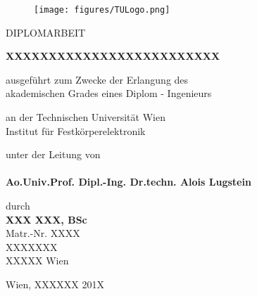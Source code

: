 
\begin{titlepage}

\begin{center}

\begin{figure}[ht]
	\centering
		\texttt{[image: figures/TULogo.png]}
	\label{fig:TULogo}
\end{figure}



\vfill

\LARGE{DIPLOMARBEIT}\\

\vfill

\LARGE{\textbf{XXXXXXXXXXXXXXXXXXXXXXXXX}}\\
\vfill

\large
ausgef\"uhrt zum Zwecke der Erlangung des\\
akademischen Grades eines 
Diplom - Ingenieurs\vfill

an der Technischen Universit\"at Wien \\
Institut f\"ur Festk\"orperelektronik\\

\vfill

unter der Leitung von\\
~\\
\textbf{Ao.Univ.Prof. Dipl.-Ing. Dr.techn. Alois Lugstein} \\
\vfill

durch\\
\textbf{XXX XXX, BSc} \\
Matr.-Nr. XXXX\\
XXXXXXX\\
XXXXX Wien\\

\vfill

\vfill

\vfill

\vfill

\vfill 

\small{Wien, XXXXXX 201X}


\end{center}
\end{titlepage}
